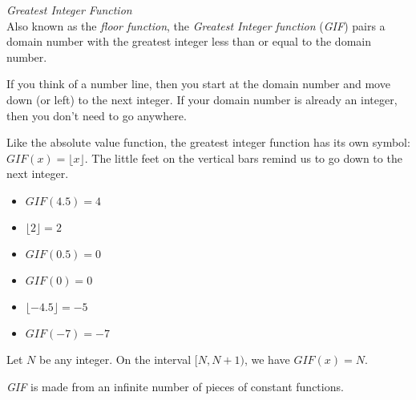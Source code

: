 \documentclass{ximera}
\begin{document}
\begin{example} \textit{Greatest Integer Function} \\
Also known as the \textit{floor function}, the \textit{Greatest Integer function} (\textit{GIF}) pairs a domain number with the greatest integer less than or equal to the domain number.

If you think of a number line, then you start at the domain number and move down (or left) to the next integer.  If your domain number is already an integer, then you don't need to go anywhere.


Like the absolute value function, the greatest integer function has its own symbol:  $GIF(x) = \lfloor x \rfloor$. The little feet on the vertical bars remind us to go down to the next integer.

\begin{itemize}
\item $GIF(4.5) = 4$
\item $\lfloor 2 \rfloor = 2$
\item $GIF(0.5) = 0$
\item $GIF(0) = 0$
\item $\lfloor -4.5 \rfloor = -5$
\item $GIF(-7) = -7$
\end{itemize}




Let $N$ be any integer. On the interval $[N, N+1)$, we have $GIF(x) = N$.

\textit{GIF} is made from an infinite number of pieces of constant functions.







\end{example}
\end{document}
